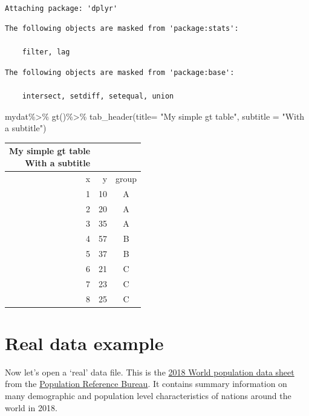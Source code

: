 \documentclass[
  letterpaper,
  DIV=11,
  numbers=noendperiod]{scrreprt}
\newenvironment{Shaded}{\begin{snugshade}}{\end{snugshade}}
\newcommand{\AttributeTok}[1]{\textcolor[rgb]{0.40,0.45,0.13}{#1}}
\newcommand{\FunctionTok}[1]{\textcolor[rgb]{0.28,0.35,0.67}{#1}}
\newcommand{\NormalTok}[1]{\textcolor[rgb]{0.00,0.23,0.31}{#1}}
\newcommand{\SpecialCharTok}[1]{\textcolor[rgb]{0.37,0.37,0.37}{#1}}
\newcommand{\StringTok}[1]{\textcolor[rgb]{0.13,0.47,0.30}{#1}}
\begin{document}
\begin{verbatim}

Attaching package: 'dplyr'
\end{verbatim}

\begin{verbatim}
The following objects are masked from 'package:stats':

    filter, lag
\end{verbatim}

\begin{verbatim}
The following objects are masked from 'package:base':

    intersect, setdiff, setequal, union
\end{verbatim}

\begin{Shaded}
\begin{Highlighting}[]
\NormalTok{mydat}\SpecialCharTok{\%\textgreater{}\%}
  \FunctionTok{gt}\NormalTok{()}\SpecialCharTok{\%\textgreater{}\%}
  \FunctionTok{tab\_header}\NormalTok{(}\AttributeTok{title=} \StringTok{"My simple gt table"}\NormalTok{,}
             \AttributeTok{subtitle =} \StringTok{"With a subtitle"}\NormalTok{)}
\end{Highlighting}
\end{Shaded}

\begin{longtable*}{rrc}
\caption*{
{\large My simple gt table} \\ 
{\small With a subtitle}
} \\ 
\toprule
x & y & group \\ 
 & 10 & A \\ 
2 & 20 & A \\ 
3 & 35 & A \\ 
4 & 57 & B \\ 
5 & 37 & B \\ 
6 & 21 & C \\ 
7 & 23 & C \\ 
8 & 25 & C \\ 
\bottomrule
\end{longtable*}

\hypertarget{real-data-example}{%
\section{Real data example}\label{real-data-example}}

Now let's open a `real' data file. This is the
\href{https://www.prb.org/2018-world-population-data-sheet-with-focus-on-changing-age-structures/}{2018
World population data sheet} from the
\href{http://www.prb.org}{Population Reference Bureau}. It contains
summary information on many demographic and population level
characteristics of nations around the world in 2018.
\end{document}
